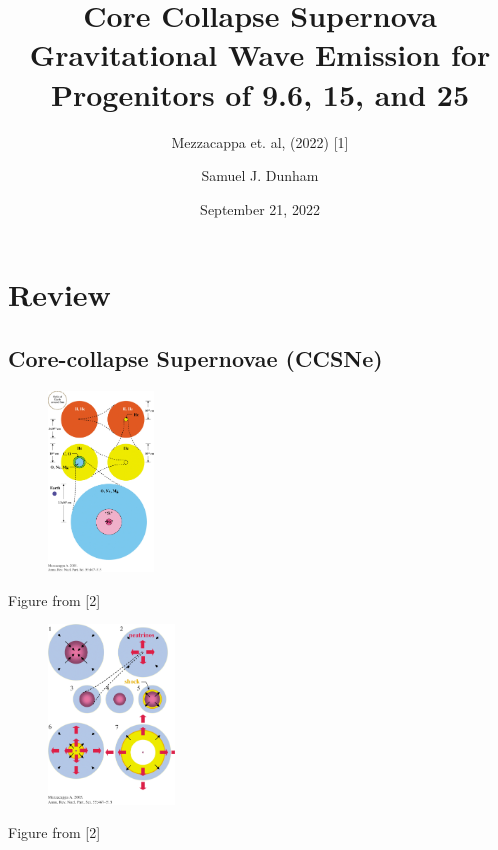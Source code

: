 \documentclass[aspectratio=169]{beamer}
\title[September 21, 2022]%
{Core Collapse Supernova Gravitational Wave Emission for
Progenitors of 9.6, 15, and 25}%
\subtitle{Mezzacappa et. al, (2022) [1]}
\author[AJC]{Samuel J. Dunham}
\institute[Vanderbilt University]
{
  Department of Astronomy \\
  Vanderbilt University
}
\date{September 21, 2022}
\begin{document}

\begin{frame}[plain]
  \titlepage
\end{frame}


\section{Review}

\subsection{Core-collapse Supernovae (CCSNe)}

\begin{frame}

  \begin{figure}
    \includegraphics[width=0.25\textwidth]{Figures/onion.jpeg}
  \end{figure}
  Figure from [2]

\end{frame}

\begin{frame}

  \begin{figure}
    \includegraphics[width=0.3\textwidth]{Figures/explosion.jpeg}
  \end{figure}
  Figure from [2]

\end{frame}
\end{document}
